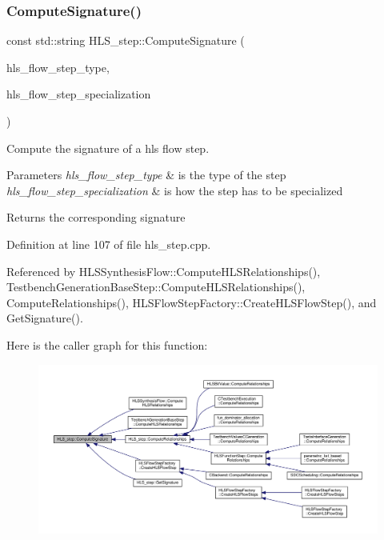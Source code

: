 \subsubsection{\texorpdfstring{Compute\+Signature()}{ComputeSignature()}}
{\footnotesize\ttfamily const std\+::string H\+L\+S\+\_\+step\+::\+Compute\+Signature (\begin{DoxyParamCaption}\item[{const \hyperlink{hls__step_8hpp_ada16bc22905016180e26fc7e39537f8d}{H\+L\+S\+Flow\+Step\+\_\+\+Type}}]{hls\+\_\+flow\+\_\+step\+\_\+type,  }\item[{const \hyperlink{hls__step_8hpp_a5fdd2edf290c196531d21d68e13f0e74}{H\+L\+S\+Flow\+Step\+Specialization\+Const\+Ref}}]{hls\+\_\+flow\+\_\+step\+\_\+specialization }\end{DoxyParamCaption})\hspace{0.3cm}{\ttfamily [static]}}



Compute the signature of a hls flow step. 


\begin{DoxyParams}{Parameters}
{\em hls\+\_\+flow\+\_\+step\+\_\+type} & is the type of the step \\
\hline
{\em hls\+\_\+flow\+\_\+step\+\_\+specialization} & is how the step has to be specialized \\
\hline
\end{DoxyParams}
\begin{DoxyReturn}{Returns}
the corresponding signature 
\end{DoxyReturn}


Definition at line 107 of file hls\+\_\+step.\+cpp.



Referenced by H\+L\+S\+Synthesis\+Flow\+::\+Compute\+H\+L\+S\+Relationships(), Testbench\+Generation\+Base\+Step\+::\+Compute\+H\+L\+S\+Relationships(), Compute\+Relationships(), H\+L\+S\+Flow\+Step\+Factory\+::\+Create\+H\+L\+S\+Flow\+Step(), and Get\+Signature().

Here is the caller graph for this function\+:
\nopagebreak
\begin{figure}[H]
\begin{center}
\leavevmode
\includegraphics[width=350pt]{da/d27/classHLS__step_ad83e627f771dd1b2315f568321475316_icgraph}
\end{center}
\end{figure}
\mbox{\label{classHLS__step_a4dfb9e61584699f0650b0a38eabbb31f}} 
